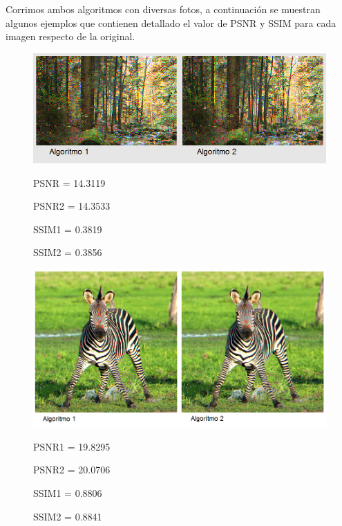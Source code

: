\documentclass[a4paper]{article}
\begin{document}
Corrimos ambos algoritmos con diversas fotos, a continuaci\'on se muestran algunos ejemplos que contienen detallado el valor de PSNR y SSIM para cada imagen respecto de la original.

\begin{figure}[h!]
	\caption{}
	\begin{center}
	\includegraphics[scale=0.60]{imagenes/Vecino/arbolitos}
	\label{arbolitos}
	
	PSNR =   14.3119

PSNR2 =   14.3533

SSIM1 =    0.3819

SSIM2 =    0.3856
  \end{center}
\end{figure}

\begin{figure}[h!]
	\caption{}
	\begin{center}
	\includegraphics[scale=0.60]{imagenes/Vecino/zebraCara}
	\label{zebraCara}
	
PSNR1 =   19.8295

PSNR2 =   20.0706

SSIM1 =    0.8806

SSIM2 =    0.8841
  \end{center}
\end{figure}
\end{document}
